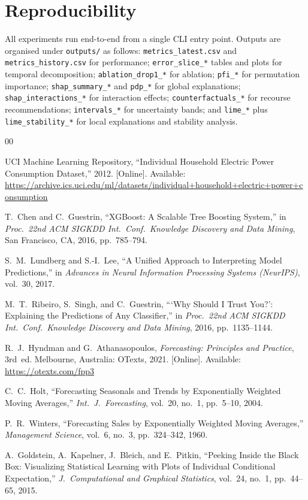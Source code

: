 \documentclass[10pt,twocolumn,letterpaper]{article}
\begin{document}
\section*{Reproducibility}

All experiments run end-to-end from a single CLI entry point. Outputs
are organised under \texttt{outputs/} as follows:
\texttt{metrics\_latest.csv} and \texttt{metrics\_history.csv} for
performance; \texttt{error\_slice\_*} tables and plots for temporal
decomposition; \texttt{ablation\_drop1\_*} for ablation;
\texttt{pfi\_*} for permutation importance; \texttt{shap\_summary\_*}
and \texttt{pdp\_*} for global explanations; \texttt{shap\_interactions\_*}
for interaction effects; \texttt{counterfactuals\_*} for recourse
recommendations; \texttt{intervals\_*} for uncertainty bands; and
\texttt{lime\_*} plus \texttt{lime\_stability\_*} for local
explanations and stability analysis.

\begin{thebibliography}{00}

UCI Machine Learning Repository, ``Individual Household Electric Power
Consumption Dataset,'' 2012. [Online]. Available:
\url{https://archive.ics.uci.edu/ml/datasets/individual+household+electric+power+consumption}

T.~Chen and C.~Guestrin, ``XGBoost: A Scalable Tree Boosting System,''
in \textit{Proc.\ 22nd ACM SIGKDD Int.\ Conf.\ Knowledge Discovery and
Data Mining}, San Francisco, CA, 2016, pp.~785--794.

S.~M.~Lundberg and S.-I.~Lee, ``A Unified Approach to Interpreting
Model Predictions,'' in \textit{Advances in Neural Information
Processing Systems (NeurIPS)}, vol.~30, 2017.

M.~T.~Ribeiro, S.~Singh, and C.~Guestrin, ```Why Should I Trust
You?': Explaining the Predictions of Any Classifier,'' in
\textit{Proc.\ 22nd ACM SIGKDD Int.\ Conf.\ Knowledge Discovery and
Data Mining}, 2016, pp.~1135--1144.

R.~J.~Hyndman and G.~Athanasopoulos, \textit{Forecasting: Principles
and Practice}, 3rd~ed. Melbourne, Australia: OTexts, 2021. [Online].
Available: \url{https://otexts.com/fpp3}

C.~C.~Holt, ``Forecasting Seasonals and Trends by Exponentially
Weighted Moving Averages,'' \textit{Int.\ J.\ Forecasting}, vol.~20,
no.~1, pp.~5--10, 2004.

P.~R.~Winters, ``Forecasting Sales by Exponentially Weighted Moving
Averages,'' \textit{Management Science}, vol.~6, no.~3,
pp.~324--342, 1960.

A.~Goldstein, A.~Kapelner, J.~Bleich, and E.~Pitkin, ``Peeking Inside
the Black Box: Visualizing Statistical Learning with Plots of
Individual Conditional Expectation,'' \textit{J.\ Computational and
Graphical Statistics}, vol.~24, no.~1, pp.~44--65, 2015.

\end{thebibliography}
\end{document}
